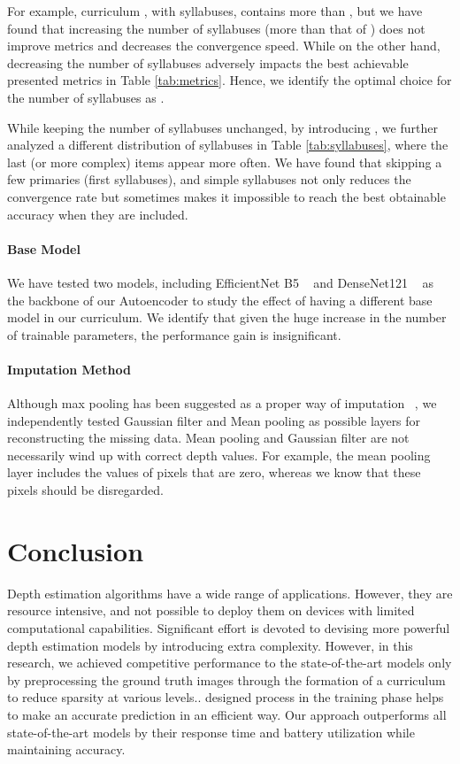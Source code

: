 \documentclass{article}
\begin{document}
For example, curriculum , with  syllabuses, contains more than , but we have found that increasing the number of syllabuses (more than that of ) does not improve metrics and decreases the convergence speed. While on the other hand, decreasing the number of syllabuses adversely impacts the best achievable presented metrics in Table \ref{tab:metrics}. Hence, we identify the optimal choice for the number of syllabuses as .



While keeping the number of syllabuses unchanged, by introducing , we further analyzed a different distribution of syllabuses in Table \ref{tab:syllabuses}, where the last (or more complex) items appear more often. We have found that skipping a few primaries (first syllabuses), and simple syllabuses not only reduces the convergence rate but sometimes makes it impossible to reach the best obtainable accuracy when they are included.
\paragraph{Base Model}
We have tested two models, including EfficientNet B5 ~\cite{tan2019efficientnet} and DenseNet121 ~\cite{huang2017densely} as the backbone of our Autoencoder to study the effect of having a different base model in our curriculum. We identify that given the huge increase in the number of trainable parameters, the performance gain is insignificant.

\paragraph{Imputation Method}
Although max pooling has been suggested as a proper way of imputation ~\cite{fu2019monocular}, we independently tested Gaussian filter and Mean pooling as possible layers for reconstructing the missing data. Mean pooling and Gaussian filter are not necessarily wind up with correct depth values. For example, the mean pooling layer includes the values of pixels that are zero, whereas we know that these pixels should be disregarded. 

\section{Conclusion}
\label{sec:conclusion}
Depth estimation algorithms have a wide range of applications. However, they are resource intensive, and not possible to deploy them on devices with limited computational capabilities.
Significant effort is devoted to devising more powerful depth estimation models by introducing extra complexity. However, in this research, we achieved competitive performance to the state-of-the-art models only by preprocessing the ground truth images through the formation of a curriculum to reduce sparsity at various levels.. designed process in the training phase helps to make an accurate prediction in an efficient way. Our approach outperforms all state-of-the-art models by their response time and battery utilization while maintaining accuracy. 
 


\end{document}
